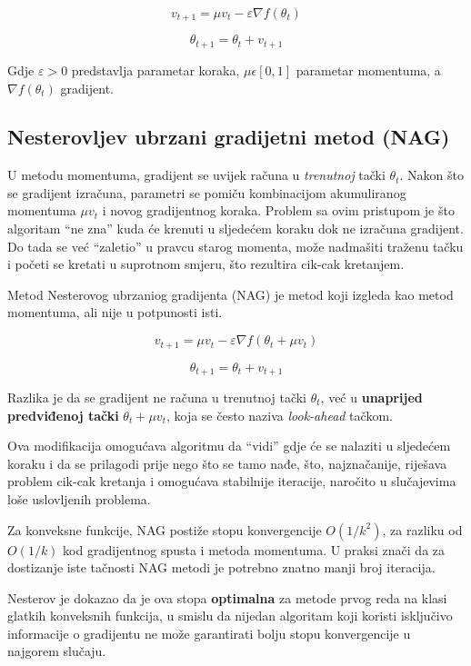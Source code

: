 \begin{equation}
    v_{t+1} = \mu v_t - \varepsilon \nabla  f(\theta _t)
\end{equation}

\begin{equation}
    \theta _{t+1} = \theta _t + v_{t+1}
\end{equation}

Gdje \(\varepsilon > 0 \) predstavlja parametar koraka, \(\mu \epsilon [0,1] \) parametar momentuma, a \( \nabla  f(\theta _t) \) gradijent.\cite{sutskever2013}

\subsection{Nesterovljev ubrzani gradijetni metod (NAG)}

U metodu momentuma, gradijent se uvijek računa u \textit{trenutnoj} tački
$\theta_t$. Nakon što se gradijent izračuna, parametri se pomiču kombinacijom
akumuliranog momentuma $\mu v_t$ i novog gradijentnog koraka.
Problem sa ovim pristupom je što algoritam ``ne zna'' kuda će krenuti u
sljedećem koraku dok ne izračuna gradijent. Do tada se već ``zaletio'' u
pravcu starog momenta, može nadmašiti traženu tačku i početi se kretati u suprotnom smjeru, što rezultira cik-cak kretanjem.

Metod Nesterovog ubrzaniog gradijenta (NAG) je metod koji izgleda kao metod momentuma, ali nije u potpunosti isti.

\begin{equation}
    v_{t+1} = \mu v_t - \varepsilon \nabla  f(\theta _t +\mu v_t)
\end{equation}

\begin{equation}
    \theta _{t+1} = \theta _t + v_{t+1}
\end{equation}

Razlika je da se gradijent ne računa u trenutnoj tački $\theta_t$, već u \textbf{unaprijed predviđenoj
    tački} $\theta_t + \mu v_t$, koja se često naziva \textit{look-ahead} tačkom.

Ova modifikacija omogućava algoritmu da ``vidi'' gdje će se nalaziti u sljedećem koraku i da se prilagodi prije nego što se tamo nađe,
što, najznačanije, riješava problem cik-cak kretanja i omogućava stabilnije iteracije, naročito u slučajevima loše uslovljenih problema.

Za konveksne funkcije, NAG postiže stopu konvergencije $O(1/k^2)$, za razliku od $O(1/k)$ kod gradijentnog spusta i metoda momentuma.
U praksi znači da za dostizanje iste tačnosti NAG metodi je potrebno znatno manji broj iteracija. \cite{nesterov1983}

Nesterov je dokazao da je ova stopa \textbf{optimalna} za metode
prvog reda na klasi glatkih konveksnih funkcija, u smislu da nijedan algoritam
koji koristi isključivo informacije o gradijentu ne može garantirati bolju
stopu konvergencije u najgorem slučaju.




